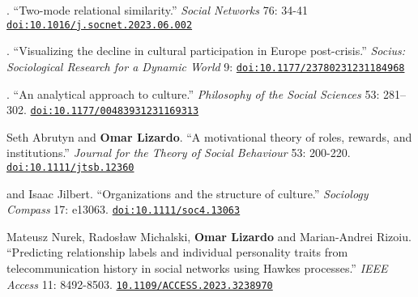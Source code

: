 
. ``Two-mode relational similarity.'' {\em Social Networks}  76: 34-41 \href{https://doi.org/10.1016/j.socnet.2023.06.002}{\nolinkurl{doi:10.1016/j.socnet.2023.06.002}}

. ``Visualizing the decline in cultural participation in Europe post-crisis.'' {\em Socius: Sociological Research for a Dynamic World} 9: \href{https://doi.org/10.1177/23780231231184968}{\nolinkurl{doi:10.1177/23780231231184968}}

. ``An analytical approach to culture.'' {\em Philosophy of the Social Sciences} 53: 281–302. \href{https://doi.org/10.1177/00483931231169313}{\nolinkurl{doi:10.1177/00483931231169313}}

\ind Seth Abrutyn and {\bf Omar Lizardo}. ``A motivational theory of roles, rewards, and institutions.'' {\em Journal for the Theory of Social Behaviour} 53: 200-220. \href{https://doi.org/10.1111/jtsb.12360}{\nolinkurl{doi:10.1111/jtsb.12360}}

 and Isaac Jilbert. ``Organizations and the structure of culture.'' {\em Sociology Compass} 17: e13063. \href{https://doi.org/10.1111/soc4.13063}{\nolinkurl{doi:10.1111/soc4.13063}}

\ind Mateusz Nurek, Rados\l{}aw Michalski, {\bf Omar Lizardo} and Marian-Andrei Rizoiu. ``Predicting relationship labels and individual personality traits from telecommunication history in social networks using Hawkes processes.'' {\em IEEE Access} 11: 8492-8503. \href{https://doi.org/10.1109/ACCESS.2023.3238970}{\nolinkurl{10.1109/ACCESS.2023.3238970}}
